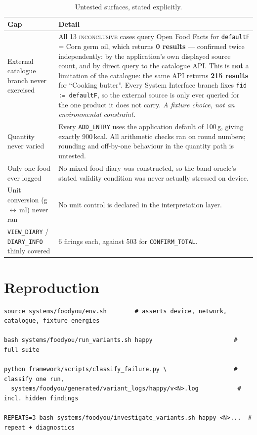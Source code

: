 \documentclass[11pt,a4paper]{article}
\newcommand{\gate}[1]{\texttt{\small #1}}
\begin{document}
\begin{table}[h]
\centering\footnotesize
\caption{Untested surfaces, stated explicitly.}
\begin{tabular}{@{}p{4.2cm}p{11.2cm}@{}}
\toprule
\textbf{Gap} & \textbf{Detail} \\
\midrule
External catalogue branch never exercised &
All 13 \textsc{inconclusive} cases query Open Food Facts for
\texttt{defaultF} = Corn germ oil, which returns \textbf{0 results} --- confirmed
twice independently: by the application's own displayed source count, and by direct
query to the catalogue API. This is \textbf{not} a limitation of the catalogue: the
same API returns \textbf{215 results} for ``Cooking butter''. Every System Interface
branch fixes \texttt{fid := defaultF}, so the external source is only ever queried
for the one product it does not carry. \emph{A fixture choice, not an environmental
constraint.} \\
\addlinespace
Quantity never varied &
Every \gate{ADD\_ENTRY} uses the application default of 100\,g, giving exactly
900\,kcal. All arithmetic checks ran on round numbers; rounding and off-by-one
behaviour in the quantity path is untested. \\
\addlinespace
Only one food ever logged &
No mixed-food diary was constructed, so the band oracle's stated validity condition
was never actually stressed on device. \\
\addlinespace
Unit conversion (g\,$\leftrightarrow$\,ml) never ran &
No unit control is declared in the interpretation layer. \\
\addlinespace
\gate{VIEW\_DIARY} / \gate{DIARY\_INFO} thinly covered &
6 firings each, against 503 for \gate{CONFIRM\_TOTAL}. \\
\bottomrule
\end{tabular}
\end{table}

\section{Reproduction}
\label{sec:repro}

\begin{lstlisting}
source systems/foodyou/env.sh        # asserts device, network, catalogue, fixture energies

bash systems/foodyou/run_variants.sh happy                       # full suite

python framework/scripts/classify_failure.py \                   # classify one run,
  systems/foodyou/generated/variant_logs/happy/v<N>.log           # incl. hidden findings

REPEATS=3 bash systems/foodyou/investigate_variants.sh happy <N>...  # repeat + diagnostics
\end{lstlisting}
\end{document}
